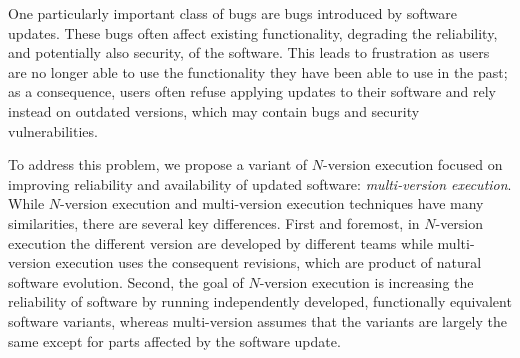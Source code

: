 

One particularly important class of bugs are bugs introduced by software
updates. These bugs often affect existing functionality, degrading the
reliability, and potentially also security, of the software. This leads to
frustration as users are no longer able to use the functionality they have been
able to use in the past; as a consequence, users often refuse applying updates
to their software and rely instead on outdated versions, which may contain bugs
and security vulnerabilities.

To address this problem, we propose a variant of $N$-version execution focused
on improving reliability and availability of updated software:
\emph{multi-version execution}.  While $N$-version execution and multi-version
execution techniques have many similarities, there are several key differences.
First and foremost, in $N$-version execution the different version are
developed by different teams while multi-version execution uses the consequent
revisions, which are product of natural software evolution. Second, the goal of
$N$-version execution is increasing the reliability of software by running
independently developed, functionally equivalent software variants, whereas
multi-version assumes that the variants are largely the same except for parts
affected by the software update.

